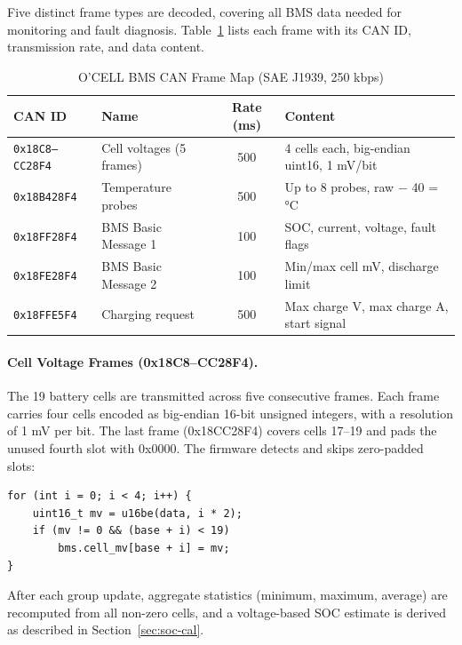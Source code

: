 Five distinct frame types are decoded, covering all BMS data needed for monitoring and fault diagnosis. Table~\ref{tab:can-frames} lists each frame with its CAN ID, transmission rate, and data content.

\begin{table}[h]
    \centering
    \caption{O'CELL BMS CAN Frame Map (SAE J1939, 250 kbps)}
    \label{tab:can-frames}
    \begin{tabular}{llcl}
        \toprule
        \textbf{CAN ID} & \textbf{Name} & \textbf{Rate (ms)} & \textbf{Content} \\
        \midrule
        \texttt{0x18C8--CC28F4} & Cell voltages (5 frames) & 500 & 4 cells each, big-endian uint16, 1 mV/bit \\
        \texttt{0x18B428F4}     & Temperature probes        & 500 & Up to 8 probes, raw $-$ 40 = °C \\
        \texttt{0x18FF28F4}     & BMS Basic Message 1       & 100 & SOC, current, voltage, fault flags \\
        \texttt{0x18FE28F4}     & BMS Basic Message 2       & 100 & Min/max cell mV, discharge limit \\
        \texttt{0x18FFE5F4}     & Charging request          & 500 & Max charge V, max charge A, start signal \\
        \bottomrule
    \end{tabular}
\end{table}

\paragraph{Cell Voltage Frames (0x18C8--CC28F4).}
The 19 battery cells are transmitted across five consecutive frames. Each frame carries four cells encoded as big-endian 16-bit unsigned integers, with a resolution of 1 mV per bit. The last frame (0x18CC28F4) covers cells 17--19 and pads the unused fourth slot with 0x0000. The firmware detects and skips zero-padded slots:

\begin{verbatim}
for (int i = 0; i < 4; i++) {
    uint16_t mv = u16be(data, i * 2);
    if (mv != 0 && (base + i) < 19)
        bms.cell_mv[base + i] = mv;
}
\end{verbatim}

After each group update, aggregate statistics (minimum, maximum, average) are recomputed from all non-zero cells, and a voltage-based SOC estimate is derived as described in Section~\ref{sec:soc-cal}.

